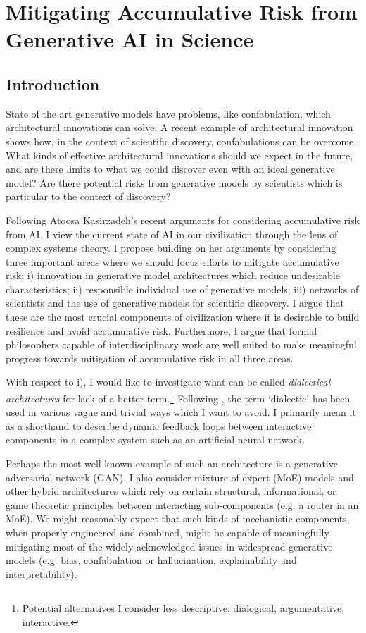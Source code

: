 \documentclass[11pt, oneside]{article}   	%
\begin{document}
\section{Mitigating Accumulative Risk from Generative AI in Science}


\subsection{Introduction}

State of the art generative models have problems, like confabulation, which architectural innovations can solve.  A recent example of architectural innovation  \citep{FunSearch2024} shows how, in the context of scientific discovery, confabulations can be overcome.  What kinds of effective architectural innovations should we expect in the future, and are there limits to what we could discover even with an ideal generative model?  Are there potential risks from generative models by scientists which is particular to the context of discovery?

Following Atoosa Kasirzadeh’s recent arguments for considering accumulative risk from AI, I view the current state of AI in our civilization through the lens of complex systems theory. I propose building on her arguments by considering three important areas where we should focus efforts to mitigate accumulative risk: i) innovation in generative model architectures which reduce undesirable characteristics; ii) responsible individual use of generative models; iii) networks of scientists and the use of generative models for scientific discovery. I argue that these are the most crucial components of civilization where it is desirable to build resilience and avoid accumulative risk.  Furthermore, I argue that formal philosophers capable of interdisciplinary work are well suited to make meaningful progress towards mitigation of accumulative risk in all three areas.


With respect to i), I would like to investigate what can be called \emph{dialectical architectures} for lack of a better term.\footnote{Potential alternatives I consider  less descriptive: dialogical, argumentative, interactive.}  Following \citep[\S 15]{PopperCR1963}, the term `dialectic' has been used in various vague and trivial ways which I want to avoid. I primarily mean it as a shorthand to describe dynamic feedback loops between interactive components in a complex system such as an artificial neural network.  

Perhaps the most well-known example of such an architecture is a generative adversarial network (GAN).  I also consider mixture of expert (MoE) models and other hybrid architectures which rely on certain structural, informational, or game theoretic principles between interacting sub-components (e.g. a router in an MoE).  We might reasonably expect that such kinds of mechanistic components, when properly engineered and combined, might be capable of meaningfully mitigating most of the widely acknowledged issues in widespread generative models (e.g. bias, confabulation or hallucination, explainability and interpretability). 
\end{document}
